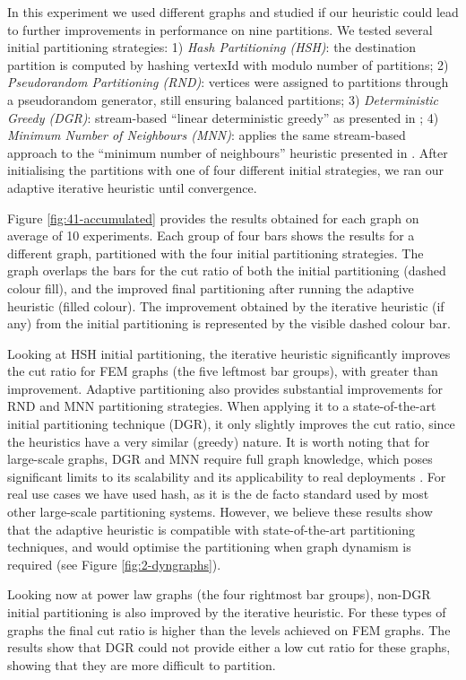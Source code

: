 \documentclass{sig-alternate-10pt}
\begin{document}
In this experiment we used different graphs and studied if our heuristic could lead to further improvements in performance on nine partitions. We tested several initial partitioning strategies: 1) \emph{Hash Partitioning (HSH)}: the destination partition is computed by hashing vertexId with modulo number of partitions; 2) \emph{Pseudorandom Partitioning (RND)}: vertices were assigned to partitions through a pseudorandom generator, still ensuring balanced partitions; 3) \emph{Deterministic Greedy (DGR)}: stream-based ``linear deterministic greedy'' as presented in \cite{Stanton2012}; 4) \emph{Minimum Number of Neighbours (MNN)}: applies the same stream-based approach to the ``minimum number of neighbours'' heuristic presented in \cite{Prabha12}. After initialising the partitions with one of four different initial strategies, we ran our adaptive iterative heuristic until convergence. 

Figure \ref{fig:41-accumulated} provides the results obtained for each graph on average of 10 experiments. Each group of four bars shows the results for a different graph, partitioned with the four initial partitioning strategies. The graph overlaps the bars for the cut ratio of both the initial partitioning (dashed colour fill), and the improved final partitioning after running the adaptive heuristic (filled colour). The improvement obtained by the iterative heuristic (if any) from the initial partitioning is represented by the visible dashed colour bar.

Looking at HSH initial partitioning, the iterative heuristic significantly improves the cut ratio for FEM graphs (the five leftmost bar groups), with greater than  improvement. Adaptive partitioning also provides substantial improvements for RND and MNN partitioning strategies. When applying it to a state-of-the-art initial partitioning technique (DGR), it only slightly improves the cut ratio, since the heuristics have a very similar (greedy) nature. It is worth noting that for large-scale graphs, DGR and MNN require full graph knowledge, which poses significant limits to its scalability and its applicability to real deployments \cite{Ugander}. For real use cases we have used hash, as it is the de facto standard used by most other large-scale partitioning systems. However, we believe these results show that  the adaptive heuristic is compatible with state-of-the-art partitioning techniques, and would optimise the partitioning when graph dynamism is required (see Figure \ref{fig:2-dyngraphs}). 

Looking now at power law graphs (the four rightmost bar groups), non-DGR initial partitioning is also improved by the iterative heuristic. For these types of graphs the final cut ratio is higher than the levels achieved on FEM graphs. The results show that DGR could not provide either a low cut ratio for these graphs, showing that they are more difficult to partition.
\end{document}
